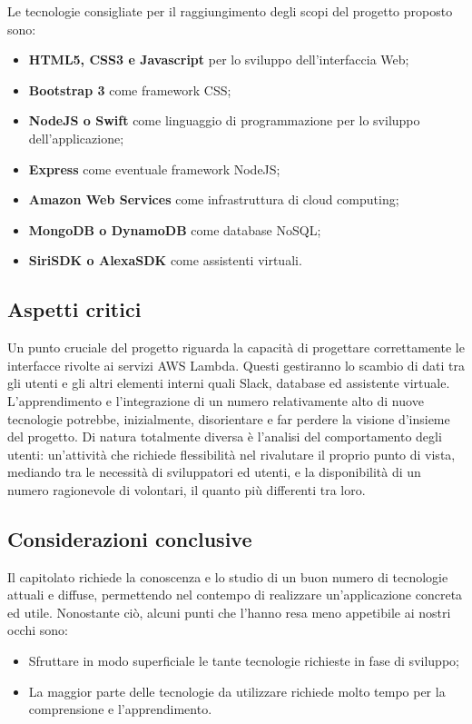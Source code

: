 Le tecnologie consigliate per il raggiungimento degli scopi del progetto
proposto sono:
\begin{itemize}
	\item \textbf{HTML5, CSS3 e Javascript }per lo sviluppo dell'interfaccia
	Web;
	\item \textbf{Bootstrap 3} come framework CSS;
	\item \textbf{NodeJS o Swift} come linguaggio di programmazione per lo
	sviluppo dell'applicazione;
	\item \textbf{Express} come eventuale framework NodeJS;
	\item \textbf{Amazon Web Services }come infrastruttura di cloud computing;
	\item \textbf{MongoDB o DynamoDB} come database NoSQL;
	\item \textbf{SiriSDK o AlexaSDK} come assistenti virtuali.
\end{itemize}

\subsection{Aspetti critici}

Un punto cruciale del progetto riguarda la capacità di progettare
correttamente le interfacce rivolte ai servizi AWS Lambda. Questi
gestiranno lo scambio di dati tra gli utenti e gli altri elementi
interni quali Slack, database ed assistente virtuale. L'apprendimento e l'integrazione di un numero relativamente alto di nuove tecnologie potrebbe, inizialmente, disorientare e far perdere la visione d'insieme del progetto.
Di natura totalmente diversa è l'analisi del comportamento degli
utenti: un'attività che richiede flessibilità nel rivalutare il proprio
punto di vista, mediando tra le necessità di sviluppatori ed utenti,
e la disponibilità di un numero ragionevole di volontari, il quanto più differenti tra loro.

\subsection{Considerazioni conclusive}

Il capitolato richiede la conoscenza e lo studio di un buon numero di tecnologie attuali e diffuse, permettendo nel contempo di realizzare un'applicazione concreta ed utile. Nonostante ciò, alcuni punti che l'hanno resa meno appetibile ai nostri occhi sono:
\begin{itemize}
	\item Sfruttare in modo superficiale le tante tecnologie richieste in fase di sviluppo;
	\item La maggior parte delle tecnologie da utilizzare richiede molto tempo per la comprensione e l'apprendimento.
\end{itemize}


